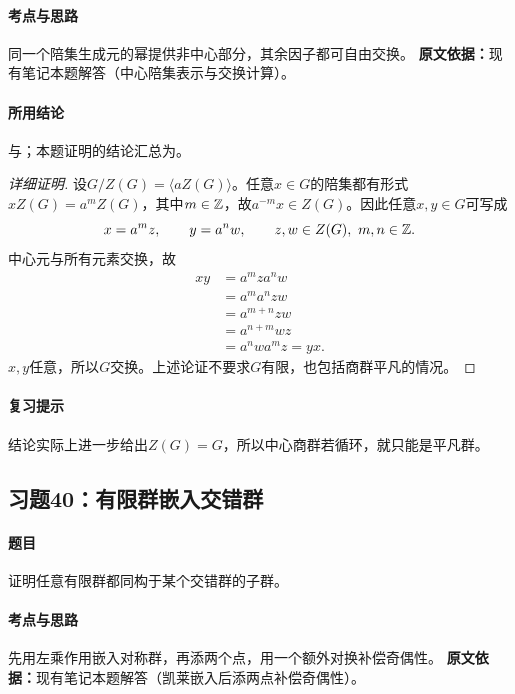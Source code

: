 \paragraph{考点与思路}同一个陪集生成元的幂提供非中心部分，其余因子都可自由交换。
\textbf{原文依据：}现有笔记本题解答（中心陪集表示与交换计算）。
\paragraph{所用结论}与；本题证明的结论汇总为。
\begin{proof}[详细证明]
设$G/Z(G)=\langle aZ(G)\rangle$。任意$x\in G$的陪集都有形式$xZ(G)=a^mZ(G)$，其中$m\in\mathbb Z$，故$a^{-m}x\in Z(G)$。因此任意$x,y\in G$可写成
\[
x=a^mz,\qquad y=a^nw,
\qquad z,w\in Z(G),\ m,n\in\mathbb Z.
\]
中心元与所有元素交换，故
\begin{align*}
xy&=a^mza^nw\\
&=a^ma^nzw\\
&=a^{m+n}zw\\
&=a^{n+m}wz\\
&=a^nwa^mz=yx.
\end{align*}
$x,y$任意，所以$G$交换。上述论证不要求$G$有限，也包括商群平凡的情况。
\end{proof}
\paragraph{复习提示}结论实际上进一步给出$Z(G)=G$，所以中心商群若循环，就只能是平凡群。

\subsection{习题40：有限群嵌入交错群}
\paragraph{题目}证明任意有限群都同构于某个交错群的子群。
\paragraph{考点与思路}先用左乘作用嵌入对称群，再添两个点，用一个额外对换补偿奇偶性。
\textbf{原文依据：}现有笔记本题解答（凯莱嵌入后添两点补偿奇偶性）。
